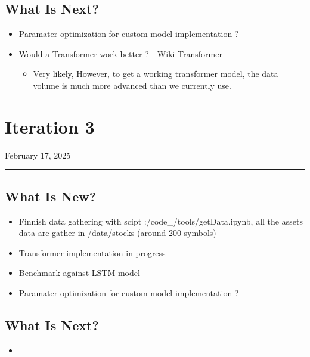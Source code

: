 \documentclass[letterpaper,11pt]{article}
\begin{document}
\subsection*{What Is Next?}
\begin{itemize}
  \item Paramater optimization for custom model implementation ?
  \item Would a Transformer work better ? - \href{https://en.wikipedia.org/wiki/Transformer_(deep_learning_architecture)}{Wiki Transformer}
  \begin{itemize}
    \item Very likely, However, to get a working transformer model, the data volume is much more advanced than we currently use.
  \end{itemize}
\end{itemize}

\newpage
\section*{Iteration 3}
\begin{flushright}
February 17, 2025
\end{flushright}
\hrule
\vspace{0.2in}
\subsection*{What Is New?}
\begin{itemize}
  \item Finnish data gathering with scipt :/code\_/tools/getData.ipynb, all the assets data are gather in /data/stocks (around 200 symbols)
  \item Transformer implementation in progress
  \item Benchmark against LSTM model
  \item Paramater optimization for custom model implementation ?
\end{itemize}

\subsection*{What Is Next?}
\begin{itemize}
  \item 
\end{itemize}
\end{document}
